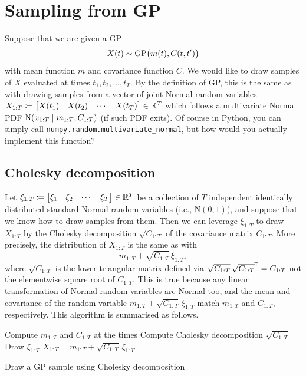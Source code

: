 \documentclass[]{article}
\begin{document}
\section{Sampling from GP}
\label{sec:gp-sampling}
Suppose that we are given a GP
%
\begin{equation*}
	X(t) \sim \mathrm{GP}\bigl( m(t), C(t, t') \bigr)
\end{equation*}
%
with mean function $m$ and covariance function $C$. We would like to draw samples of $X$ evaluated at times $t_1, t_2, \ldots, t_T$. By the definition of GP, this is the same as with drawing samples from a vector of joint Normal random variables $X_{1:T} \coloneqq \begin{bmatrix} X(t_1) & X(t_2) & \cdots & X(t_T) \end{bmatrix} \in \mathbb{R}^T$ which follows a multivariate Normal PDF $\mathrm{N}(x_{1:T} {\;|\;} m_{1:T}, C_{1:T})$ (if such PDF exits). Of course in Python, you can simply call \texttt{numpy.random.multivariate\_normal}, but how would you actually implement this function? 

\subsection{Cholesky decomposition}
\label{sec:chol}
Let $\xi_{1:T}\coloneqq \begin{bmatrix}	\xi_1 & \xi_2 & \cdots & \xi_T \end{bmatrix} \in \mathbb{R}^T$ be a collection of $T$ independent identically distributed standard Normal random variables (i.e., $\mathrm{N}(0, 1)$), and suppose that we know how to draw samples from them. Then we can leverage $\xi_{1:T}$ to draw $X_{1:T}$ by the Cholesky decomposition $\sqrt{C_{1:T}}$ of the covariance matrix $C_{1:T}$. More precisely, the distribution of $X_{1:T}$ is the same as with 
%
\begin{equation}
	m_{1:T} + \sqrt{C_{1:T}} \, \xi_{1:T},
	\label{equ:chol}
\end{equation}
%
where $\sqrt{C_{1:T}}$ is the lower triangular matrix defined via $\sqrt{C_{1:T}} \, \sqrt{C_{1:T}}^{\mkern-1.5mu\mathsf{T}} = C_{1:T}$ not the elementwise square root of $C_{1:T}$. This is true because any linear transformation of Normal random variables are Normal too, and the mean and covariance of the random variable $m_{1:T} + \sqrt{C_{1:T}} \, \xi_{1:T}$ match $m_{1:T}$ and $C_{1:T}$, respectively. This algorithm is summarised as follows.

\begin{algorithm}
	\SetAlgoLined
	Compute $m_{1:T}$ and $C_{1:T}$ at the times\;
	Compute Cholesky decomposition $\sqrt{C_{1:T}}$\;
	Draw $\xi_{1:T}$\;
	$X_{1:T} = m_{1:T} + \sqrt{C_{1:T}} \, \xi_{1:T}$\;
	\caption{Draw a GP sample using Cholesky decomposition}
	\label{alg:chol}
\end{algorithm}
\end{document}
